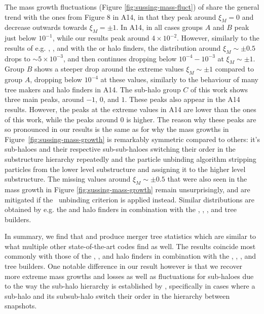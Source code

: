 The mass growth fluctuations (Figure \ref{fig:sussing-mass-fluct}) of \acacia share the
general trend with the ones from Figure 8 in A14, in that they peak around $\xi_M = 0$ and decrease
outwards towards $\xi_M = \pm 1$. In A14, in all cases groups $A$ and $B$ peak just below
$10^{-1}$, while our results peak around $4 \times 10^{-2}$. However, similarly to the results of
e.g. , , and  with the  or
 halo finders, the distribution around $\xi_M \sim \pm 0.5$ drops to $\sim 5 \times
10^{-3}$, and then continues dropping below $10^{-4} - 10^{-3}$ at $\xi_M \sim \pm 1$.
Group $B$ shows a steeper drop around the extreme values $\xi_M \sim \pm 1$ compared to group $A$,
dropping below $10^{-4}$ at these values, similarly to the behaviour of many tree makers and halo
finders in A14.
The sub-halo group $C$ of this work shows three main peaks, around $-1$, $0$, and $1$.
These peaks also appear in the A14 results.
However, the peaks at the extreme values in A14 are lower than the ones of this work, while the
peaks around $0$ is higher. The reason why these peaks are so pronounced in our results is the same as for why the mass growths in Figure~\ref{fig:sussing-mass-growth} is remarkably symmetric
compared to others: it's sub-haloes and their respective sub-sub-haloes switching their order in the substructure hierarchy repeatedly and the particle unbinding algorithm stripping particles from the lower level substructure and assigning it to the higher level substructure.
The missing values around $\xi_M \sim \pm 0.5$ that were also seen in the mass growth in Figure
\ref{fig:sussing-mass-growth} remain unsurprisingly, and are mitigated if the \nosad\ unbinding
criterion is applied instead.
Similar distributions are obtained by e.g. the  and  halo finders in
combination with the , , , and 
tree builders.

In summary, we find that \acacia and  produce merger tree statistics which are
similar to what multiple other state-of-the-art codes find as well. The results coincide most
commonly with those of the , , and  halo finders in
combination with the , , , and
 tree builders. One notable difference in our result however is that we
recover more extreme mass growths and losses as well as fluctuations for sub-haloes due to the way
the sub-halo hierarchy is established by \phew, specifically in cases where a sub-halo and its
subsub-halo switch their order in the hierarchy between snapshots.
